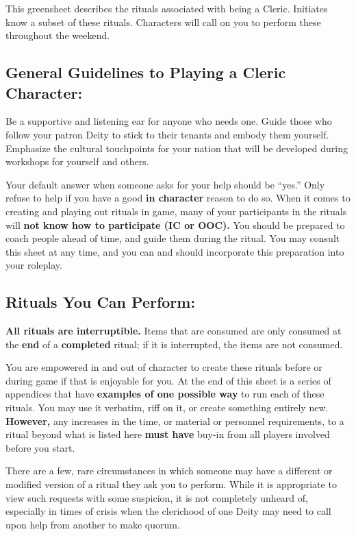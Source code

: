 \documentclass[green]{GL2020}
\begin{document}
\name{\gWRCleric{}}

This greensheet describes the rituals associated with being a Cleric. Initiates know a subset of these rituals. Characters will call on you to perform these throughout the weekend. 

\subsection*{General Guidelines to Playing a Cleric Character:}
Be a supportive and listening ear for anyone who needs one. Guide those who follow your patron Deity to stick to their tenants and embody them yourself. Emphasize the cultural touchpoints for your nation that will be developed during workshops for yourself and others.

Your default answer when someone asks for your help should be ``yes.'' Only refuse to help if you have a good \textbf{in character} reason to do so. When it comes to creating and playing out rituals in game, many of your participants in the rituals will \textbf{not know how to participate (IC or OOC).} You should be prepared to coach people ahead of time, and guide them during the ritual. You may consult this sheet at any time, and you can and should incorporate this preparation into your roleplay.

\subsection*{Rituals You Can Perform:}
\textbf{All rituals are interruptible.} Items that are consumed are only consumed at the \textbf{end} of a \textbf{completed} ritual; if it is interrupted, the items are not consumed.

You are empowered in and out of character to create these rituals before or during game if that is enjoyable for you. At the end of this sheet is a series of appendices that have \textbf{examples of one possible way} to run each of these rituals. You may use it verbatim, riff on it, or create something entirely new. \textbf{However,} any increases in the time, or material or personnel requirements, to a ritual beyond what is listed here \textbf{must have} buy-in from all players involved before you start.

There are a few, rare circumstances in which someone may have a different or modified version of a ritual they ask you to perform. While it is appropriate to view such requests with some suspicion, it is not completely unheard of, especially in times of crisis when the clerichood of one Deity may need to call upon help from another to make quorum.
\end{document}
